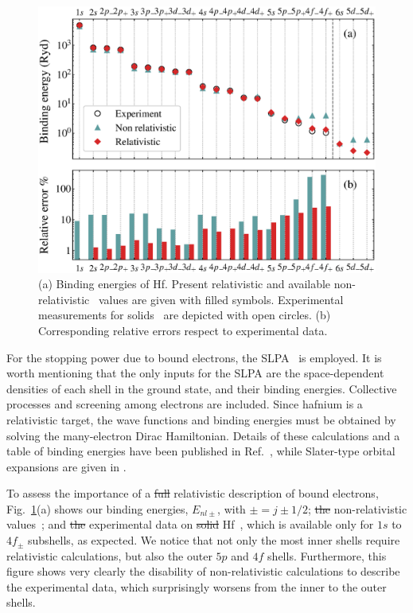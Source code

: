\documentclass[aps,pra,reprint,superscriptaddress]{revtex4-1}
\providecommand{\DIFadd}[1]{{\protect\color{blue}\uwave{#1}}} %
\providecommand{\DIFdel}[1]{{\protect\color{red}\sout{#1}}}                      %
\providecommand{\DIFaddbegin}{} %
\providecommand{\DIFaddend}{} %
\providecommand{\DIFdelbegin}{} %
\providecommand{\DIFdelend}{} %
\newcommand{\DIFscaledelfig}{0.5}
\newlength{\DIFdelgraphicswidth} %
\newlength{\DIFdelgraphicsheight} %
\newcommand{\DIFaddincludegraphics}[2][]{{\color{blue}\fbox{\DIFOincludegraphics[#1]{#2}}}} %
\newcommand{\DIFdelincludegraphics}[2][]{%
\sbox{\DIFdelgraphicsbox}{\DIFOincludegraphics[#1]{#2}}%
\settoboxwidth{\DIFdelgraphicswidth}{\DIFdelgraphicsbox} %
\settoboxtotalheight{\DIFdelgraphicsheight}{\DIFdelgraphicsbox} %
\scalebox{\DIFscaledelfig}{%
\parbox[b]{\DIFdelgraphicswidth}{\usebox{\DIFdelgraphicsbox}\\[-\baselineskip] \rule{\DIFdelgraphicswidth}{0em}}\llap{\resizebox{\DIFdelgraphicswidth}{\DIFdelgraphicsheight}{%
\setlength{\unitlength}{\DIFdelgraphicswidth}%
\begin{picture}(1,1)%
\thicklines\linethickness{2pt} %
{\color[rgb]{1,0,0}\put(0,0){\framebox(1,1){}}}%
{\color[rgb]{1,0,0}\put(0,0){\line( 1,1){1}}}%
{\color[rgb]{1,0,0}\put(0,1){\line(1,-1){1}}}%
\end{picture}%
}\hspace*{3pt}}} %
} %
\DeclareRobustCommand{\DIFaddbegin}{\DIFOaddbegin \let\includegraphics\DIFaddincludegraphics} %
\DeclareRobustCommand{\DIFaddend}{\DIFOaddend \let\includegraphics\DIFOincludegraphics} %
\DeclareRobustCommand{\DIFdelbegin}{\DIFOdelbegin \let\includegraphics\DIFdelincludegraphics} %
\DeclareRobustCommand{\DIFdelend}{\DIFOaddend \let\includegraphics\DIFOincludegraphics} %
\begin{document}
\begin{figure}[!t]
\centering
\includegraphics[width=11.cm]{bindener.eps}
\caption{(a) Binding energies of Hf. Present relativistic and available 
non-relativistic~\cite{badnell97} values are given with filled symbols. 
Experimental measurements for solids~\cite{williams1995} are depicted 
with open circles. (b) Corresponding relative errors respect to 
experimental data.}
\label{Binding_E}
\end{figure}

For the stopping power due to bound electrons, the SLPA~\cite{mon17,mon13} 
is employed. It is worth mentioning \DIFdelbegin %
\DIFdelend that the only inputs for the SLPA 
are the space-dependent densities of each shell in the ground state, 
and their binding energies. Collective processes and screening among 
electrons are included. Since \DIFdelbegin %
\DIFdelend hafnium is a relativistic target, the wave 
functions and binding energies must be obtained by solving the many-electron 
\DIFdelbegin %
\DIFdelend Dirac Hamiltonian. Details of these calculations and a table of binding 
energies have been published in Ref.~\cite{mendez2019}, while Slater-type 
orbital expansions are given in \DIFaddbegin \DIFadd{Ref.~}\DIFaddend \cite{Hf_arxiv}.

To \DIFdelbegin %
\DIFdelend assess the importance of a \DIFdelbegin \DIFdel{full }\DIFdelend \DIFaddbegin \DIFadd{fully }\DIFaddend relativistic description of bound 
electrons, Fig.~\ref{Binding_E}\DIFaddbegin \DIFadd{~}\DIFaddend (a) shows our binding energies, 
$E_{nl\pm}$, with $\pm=j\pm1/2$; \DIFdelbegin \DIFdel{the 
}\DIFdelend non-relativistic values~\cite{badnell97}; 
and \DIFdelbegin \DIFdel{the }\DIFdelend experimental data on \DIFdelbegin \DIFdel{solid }\DIFdelend \DIFaddbegin \DIFadd{solid-state }\DIFaddend Hf~\cite{williams1995}, which is 
available only for $1s$ to $4f_{\pm}$ subshells, as expected. We notice that not only the most inner shells 
require relativistic calculations, but also the outer $5p$ and $4f$ 
shells. Furthermore, this figure shows very clearly the disability of 
non-relativistic calculations to describe the experimental data, which 
surprisingly worsens from the inner to the outer shells.
\end{document}
